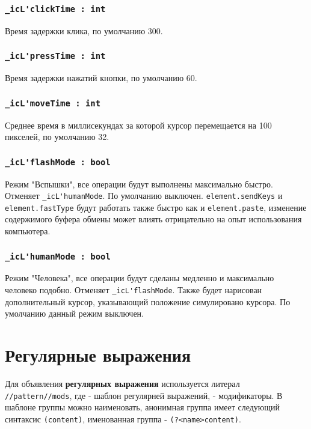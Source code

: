\documentclass[a4paper, 14pt]{extarticle}
\begin{document}
\subsubsection{\lstinline|_icL'clickTime : int|}

Время задержки клика, по умолчанию 300.

\subsubsection{\lstinline|_icL'pressTime : int|}

Время задержки нажатий кнопки, по умолчанию 60.

\subsubsection{\lstinline|_icL'moveTime : int|}

Среднее время в миллисекундах за которой курсор перемещается на 100 пикселей, по умолчанию 32.

\subsubsection{\lstinline|_icL'flashMode : bool|}

Режим "Вспышки", все операции будут выполнены максимально быстро. Отменяет \lstinline|_icL'humanMode|. По умолчанию выключен. \lstinline|element.sendKeys| и \lstinline|element.fastType| будут работать также быстро как и \lstinline|element.paste|, изменение содержимого буфера обмены может влиять отрицательно на опыт использования компьютера.

\subsubsection{\lstinline|_icL'humanMode : bool|}

Режим "Человека", все операции будут сделаны медленно и максимально человеко подобно. Отменяет \lstinline|_icL'flashMode|. Также будет нарисован дополнительный курсор, указывающий положение симулировано курсора. По умолчанию данный режим выключен.

\newpage
\section{Регулярные выражения}
\label{regex}

Для объявления {\bf регулярных выражения} используется литерал \lstinline|//pattern//mods|, где  - шаблон регулярней выражений,  - модификаторы. В шаблоне группы можно наименовать, анонимная группа имеет следующий синтаксис \lstinline|(content)|, именованная группа - \lstinline|(?<name>content)|.
\end{document}
